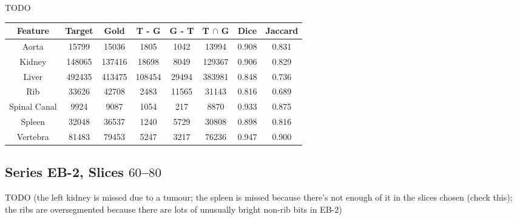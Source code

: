 TODO

\begin{center}
\begin{tabular}{cccccccc}
\scriptsize \textbf{Feature} & \scriptsize \textbf{Target} & \scriptsize \textbf{Gold} & \scriptsize \textbf{T - G} & \scriptsize \textbf{G - T} & \scriptsize \textbf{T $\cap$ G} & \scriptsize \textbf{Dice} & \scriptsize \textbf{Jaccard} \\
\hline
\scriptsize Aorta & \scriptsize 15799 & \scriptsize 15036 & \scriptsize 1805 & \scriptsize 1042 & \scriptsize 13994 & \scriptsize 0.908 & \scriptsize 0.831 \\
\scriptsize Kidney & \scriptsize 148065 & \scriptsize 137416 & \scriptsize 18698 & \scriptsize 8049 & \scriptsize 129367 & \scriptsize 0.906 & \scriptsize 0.829 \\
\scriptsize Liver & \scriptsize 492435 & \scriptsize 413475 & \scriptsize 108454 & \scriptsize 29494 & \scriptsize 383981 & \scriptsize 0.848 & \scriptsize 0.736 \\
\scriptsize Rib & \scriptsize 33626 & \scriptsize 42708 & \scriptsize 2483 & \scriptsize 11565 & \scriptsize 31143 & \scriptsize 0.816 & \scriptsize 0.689 \\
\scriptsize Spinal Canal & \scriptsize 9924 & \scriptsize 9087 & \scriptsize 1054 & \scriptsize 217 & \scriptsize 8870 & \scriptsize 0.933 & \scriptsize 0.875 \\
\scriptsize Spleen & \scriptsize 32048 & \scriptsize 36537 & \scriptsize 1240 & \scriptsize 5729 & \scriptsize 30808 & \scriptsize 0.898 & \scriptsize 0.816 \\
\scriptsize Vertebra & \scriptsize 81483 & \scriptsize 79453 & \scriptsize 5247 & \scriptsize 3217 & \scriptsize 76236 & \scriptsize 0.947 & \scriptsize 0.900 \\
\end{tabular}
\end{center}

\subsection{Series EB-2, Slices $60$--$80$}

TODO (the left kidney is missed due to a tumour; the spleen is missed because there's not enough of it in the slices chosen (check this); the ribs are oversegmented because there are lots of unusually bright non-rib bits in EB-2)

